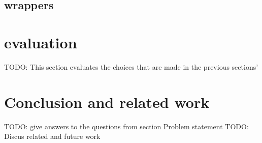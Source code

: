 \documentclass[a4paper,10pt]{scrartcl}
\begin{document}
\subsection{wrappers}
\label{subsec:wrappers}

\newpage
\section{evaluation}
\label{sec:evaluation}
TODO: This section evaluates the choices that are made in the previous sections'

\newpage
\section{Conclusion and related work}
\label{sec:conclusion}
TODO: give answers to the questions from section Problem statement
TODO: Discus related and future work
\newpage


\end{document}
